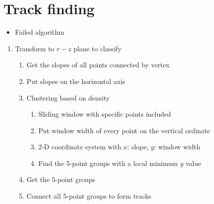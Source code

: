 \documentclass{article}
\begin{document}
\section{Track finding}
\begin{itemize}
  \item Failed algorithm
\end{itemize}
  \begin{enumerate}
    \item Transform to $r-z$ plane to classify
      \begin{enumerate}
        \item Get the slopes of all points connected by vertex
        \item Put slopes on the horizontal axis
        \item Clustering based on density
          \begin{enumerate}
            \item Sliding window with specific points included
            \item Put window width of every point on the vertical ordinate
            \item 2-D coordinate system with $x$: slope, $y$: window width
            \item Find the 5-point groups with a local minimum $y$ value
          \end{enumerate}
        \item Get the 5-point groups
        \item Connect all 5-point groups to form tracks
      \end{enumerate}
  \end{enumerate}
\end{document}
